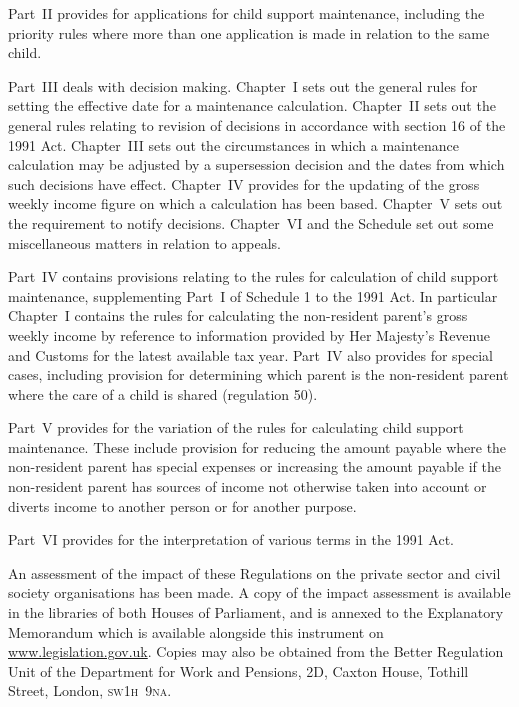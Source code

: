 \documentclass[12pt,a4paper]{article}
\begin{document}
Part~II provides for applications for child support maintenance, including the priority rules where more than one application is made in relation to the same child.

Part~III deals with decision making. Chapter~I sets out the general rules for setting the effective date for a maintenance calculation. Chapter~II sets out the general rules relating to revision of decisions in accordance with section 16 of the 1991 Act. Chapter~III sets out the circumstances in which a maintenance calculation may be adjusted by a supersession decision and the dates from which such decisions have effect. Chapter~IV provides for the updating of the gross weekly income figure on which a calculation has been based. Chapter~V sets out the requirement to notify decisions. Chapter~VI and the Schedule set out some miscellaneous matters in relation to appeals.

Part~IV contains provisions relating to the rules for calculation of child support maintenance, supplementing Part~I of Schedule 1 to the 1991 Act. In particular Chapter~I contains the rules for calculating the non-resident parent’s gross weekly income by reference to information provided by Her Majesty’s Revenue and Customs for the latest available tax year. Part~IV also provides for special cases, including provision for determining which parent is the non-resident parent where the care of a child is shared (regulation 50).

Part~V provides for the variation of the rules for calculating child support maintenance. These include provision for reducing the amount payable where the non-resident parent has special expenses or increasing the amount payable if the non-resident parent has sources of income not otherwise taken into account or diverts income to another person or for another purpose.

Part~VI provides for the interpretation of various terms in the 1991 Act.

An assessment of the impact of these Regulations on the private sector and civil society organisations has been made. A copy of the impact assessment is available in the libraries of both Houses of Parliament, and is annexed to the Explanatory Memorandum which is available alongside this instrument on \url{www.legislation.gov.uk}. Copies may also be obtained from the Better Regulation Unit of the Department for Work and Pensions, 2D, Caxton House, Tothill Street, London, \textsc{\lowercase{SW1H~9NA}}. 
\end{document}
